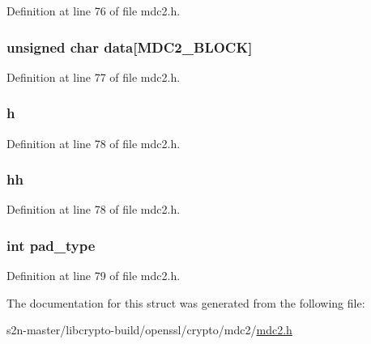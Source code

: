 Definition at line 76 of file mdc2.\+h.

\subsubsection[{\texorpdfstring{data}{data}}]{\setlength{\rightskip}{0pt plus 5cm}unsigned char data\mbox{[}{\bf M\+D\+C2\+\_\+\+B\+L\+O\+CK}\mbox{]}}\hypertarget{structmdc2__ctx__st_a334dbe9894d1087fc0023a9eb98cf2d5}{}\label{structmdc2__ctx__st_a334dbe9894d1087fc0023a9eb98cf2d5}


Definition at line 77 of file mdc2.\+h.

\subsubsection[{\texorpdfstring{h}{h}}]{ h}\hypertarget{structmdc2__ctx__st_ae2d0d122d288236d586f65bc6ecd2a38}{}\label{structmdc2__ctx__st_ae2d0d122d288236d586f65bc6ecd2a38}


Definition at line 78 of file mdc2.\+h.

\subsubsection[{\texorpdfstring{hh}{hh}}]{ hh}\hypertarget{structmdc2__ctx__st_a1f580bbafa4c401e869c1261c5ccb1e2}{}\label{structmdc2__ctx__st_a1f580bbafa4c401e869c1261c5ccb1e2}


Definition at line 78 of file mdc2.\+h.

\subsubsection[{\texorpdfstring{pad\+\_\+type}{pad_type}}]{\setlength{\rightskip}{0pt plus 5cm}int pad\+\_\+type}\hypertarget{structmdc2__ctx__st_a328df4848687bac798ba6b29d91fec92}{}\label{structmdc2__ctx__st_a328df4848687bac798ba6b29d91fec92}


Definition at line 79 of file mdc2.\+h.



The documentation for this struct was generated from the following file\+:\begin{DoxyCompactItemize}
\item 
s2n-\/master/libcrypto-\/build/openssl/crypto/mdc2/\hyperlink{mdc2_8h}{mdc2.\+h}\end{DoxyCompactItemize}

